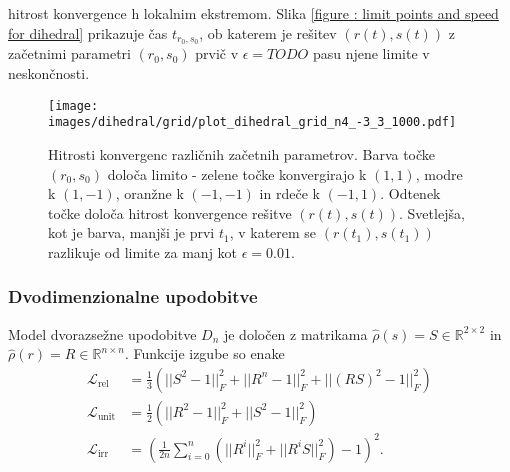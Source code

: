 \documentclass[mat2, tisk]{fmfdelo}
\newcommand{\R}{\mathbb R}
\newcommand{\Loss}[1]{\mathcal L _\text{#1}}
\begin{document}
      hitrost konvergence h lokalnim ekstremom. Slika
      \ref{figure : limit points and speed for dihedral} prikazuje
      čas $t_{r_0, s_0}$, ob katerem je rešitev $(r(t), s(t))$ z
      začetnimi parametri $(r_0, s_0)$ prvič v $\epsilon = TODO$ pasu
      njene limite v neskončnosti.
      \begin{figure}[h!]
        \label{figure : limit points and speed for dihedral}
        \centering
        \texttt{[image: images/dihedral/grid/plot\_dihedral\_grid\_n4\_-3\_3\_1000.pdf]}
        \caption{Hitrosti konvergenc različnih začetnih parametrov.
          Barva točke $(r_0,s_0)$ določa limito - zelene točke
          konvergirajo k $(1,1)$, modre k $(1,-1)$, oranžne k $(-1,-1)$
          in rdeče k $(-1,1)$. Odtenek točke določa hitrost konvergence
          rešitve $(r(t), s(t))$. Svetlejša, kot je barva, manjši je
          prvi $t_1$, v katerem se $(r(t_1), s(t_1))$ razlikuje od
        limite za manj kot $\epsilon = 0.01$.}
        \label{fig:enter-label}
      \end{figure}
      \subsubsection{Dvodimenzionalne upodobitve}
      Model dvorazsežne upodobitve $D_n$ je določen z matrikama $\hat
      \rho(s) = S \in \R^{2\times 2}$ in $\hat \rho(r) = R \in \R^{n
      \times n}$. Funkcije izgube so enake
      \begin{align*}
        \Loss{rel} &= \frac{1}{3} \left( ||S^2 -1||_F^2 + ||R^n
        -1||_F^2  + ||(RS)^2 -1||_F^2  \right )\\
        \Loss{unit} &=  \frac{1}{2} \left ( ||R^2 -1||_F^2 + ||S ^2
        -1||_F^2  \right)  \\
        \Loss{irr} &= \left ( \frac{1}{2n}\sum_{i=0}^n(||R^i||_F^2 +
        ||R^iS||_F^2)    - 1\right )^2.
      \end{align*}
\end{document}
